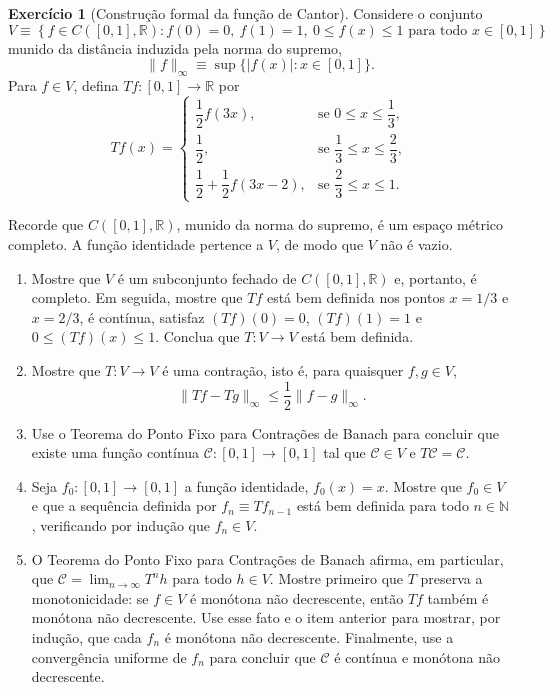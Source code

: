 \documentclass[12pt,portuguese]{article}
\theoremstyle{definition}
\theoremstyle{plainexercise}
\theoremstyle{starredexercise}
\newtheorem{starredexercise}[exercise]{Exercício}
\theoremstyle{definition}
\begin{document}
\begin{starredexercise}[Construção formal da função de Cantor]
\label{exercise:construcao-cantor-avancada}
Considere o conjunto
\[
  V\equiv \left\{f\in C([0,1],\mathbb{R}):
  f(0)=0,\ f(1)=1,\ 0\leqslant f(x)\leqslant 1\text{ para todo }x\in[0,1]\right\}
\]
munido da distância induzida pela norma do supremo,
\[
  \|f\|_{\infty}\equiv \sup\{|f(x)|:x\in[0,1]\}.
\]
Para $f\in V$, defina $Tf:[0,1]\to\mathbb{R}$ por
\[
Tf(x)=
\begin{cases}
\dfrac{1}{2}f(3x),
  &\text{se }0\leqslant x\leqslant \dfrac{1}{3},\\[0.5cm]
\dfrac{1}{2},
  &\text{se }\dfrac{1}{3}\leqslant x\leqslant \dfrac{2}{3},\\[0.5cm]
\dfrac{1}{2}+\dfrac{1}{2}f(3x-2),
  &\text{se }\dfrac{2}{3}\leqslant x\leqslant 1.
\end{cases}
\]

Recorde que $C([0,1],\mathbb{R})$, munido da norma do supremo, é um espaço
métrico completo. A função identidade pertence a $V$, de modo que $V$ não é
vazio.

\begin{enumerate}[label=\alph*)]
  \item Mostre que $V$ é um subconjunto fechado de
  $C([0,1],\mathbb{R})$ e, portanto, é completo. Em seguida, mostre que $Tf$
  está bem definida nos pontos $x=1/3$ e $x=2/3$, é contínua, satisfaz
  $(Tf)(0)=0$, $(Tf)(1)=1$ e $0\leqslant (Tf)(x)\leqslant 1$. Conclua que
  $T:V\to V$ está bem definida.

  \item Mostre que $T:V\to V$ é uma contração, isto é, para quaisquer
  $f,g\in V$,
  \[
    \|Tf-Tg\|_{\infty}\leqslant \frac{1}{2}\|f-g\|_{\infty}.
  \]

  \item Use o Teorema do Ponto Fixo para Contrações de Banach para concluir
  que existe uma função contínua $\mathcal{C}:[0,1]\to[0,1]$ tal que
  $\mathcal{C}\in V$ e $T\mathcal{C}=\mathcal{C}$.

  \item Seja $f_0:[0,1]\to[0,1]$ a função identidade, $f_0(x)=x$.
  Mostre que $f_0\in V$ e que a sequência definida por
  $f_n\equiv Tf_{n-1}$ está bem definida para todo $n\in\mathbb{N}$,
  verificando por indução que $f_n\in V$.

  \item O Teorema do Ponto Fixo para Contrações de Banach afirma, em
  particular, que $\mathcal{C}=\lim_{n\to\infty}T^nh$ para todo $h\in V$.
  Mostre primeiro que $T$ preserva a monotonicidade: se $f\in V$ é monótona
  não decrescente, então $Tf$ também é monótona não decrescente. Use esse
  fato e o item anterior para mostrar, por indução, que cada $f_n$ é monótona
  não decrescente. Finalmente, use a convergência uniforme de $f_n$ para
  concluir que $\mathcal{C}$ é contínua e monótona não decrescente.


\end{enumerate}
\end{starredexercise}
\end{document}

